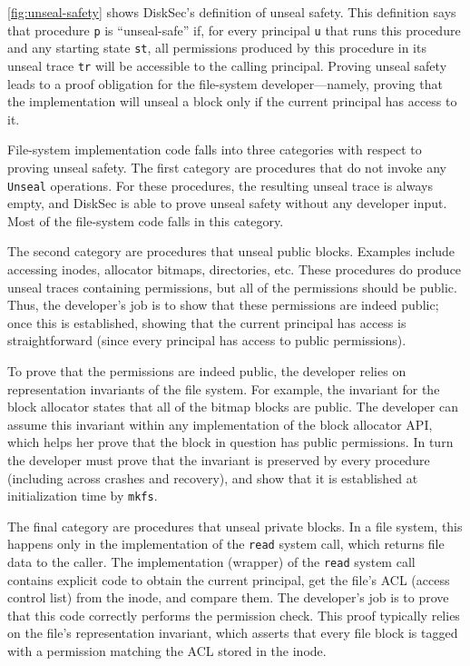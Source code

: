 \ref{fig:unseal-safety} shows DiskSec's definition of unseal safety.
This definition says that procedure \texttt{p} is ``unseal-safe'' if,
for every principal \texttt{u} that runs this procedure and any starting
state \texttt{st}, all permissions produced by this procedure in its unseal trace
\texttt{tr} will be accessible to the calling principal.
Proving unseal safety leads to a proof obligation for the file-system
developer---namely, proving that the implementation will unseal a block
only if the current principal has access to it.

File-system implementation code falls into three categories with respect
to proving unseal safety.  The first category are procedures that do not
invoke any \texttt{Unseal} operations.  For these procedures, the resulting
unseal trace is always empty, and DiskSec is able to prove unseal safety without
any developer input.  Most of the file-system code falls in this category.

The second category are procedures that unseal public blocks.
Examples include accessing inodes, allocator bitmaps, directories, etc.
These procedures do produce unseal traces containing permissions, but all
of the permissions should be public.  Thus, the developer's job is to
show that these permissions are indeed public; once this is established,
showing that the current principal has access is straightforward (since
every principal has access to public permissions).

To prove that the permissions are indeed public, the developer
relies on representation invariants of the file system.  For example, the
invariant for the block allocator states that all of the bitmap blocks
are public. The developer can assume this invariant within any implementation of
the block allocator API, which helps her prove that the block in question has
public permissions. In turn the developer must prove that the invariant is
preserved by every procedure (including across crashes and recovery), and show
that it is established at initialization time by \texttt{mkfs}.

The final category are procedures that unseal private blocks.  In a
file system, this happens only in the implementation of the \texttt{read}
system call, which returns file data to the caller.  The implementation (wrapper)
of the \texttt{read} system call contains explicit code to obtain the current
principal, get the file's ACL (access control list) from the inode, and
compare them.  The developer's job is to prove that this code correctly
performs the permission check.  This proof typically relies on the
file's representation invariant, which asserts that every file block
is tagged with a permission matching the ACL stored in the inode.

